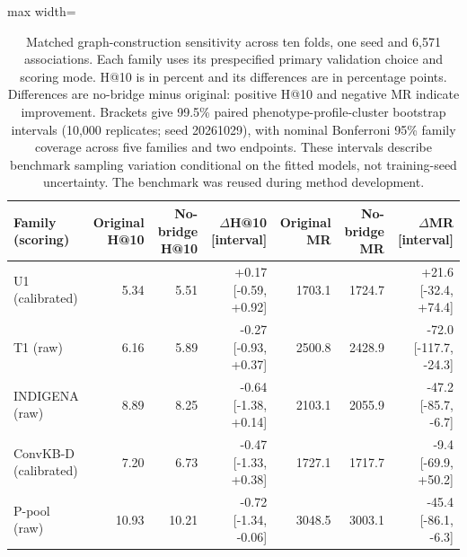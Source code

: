 \begin{table}[tb]
\centering\small
\caption{Matched graph-construction sensitivity across ten folds, one seed and 6,571 associations. Each family uses its prespecified primary validation choice and scoring mode. H@10 is in percent and its differences are in percentage points. Differences are no-bridge minus original: positive H@10 and negative MR indicate improvement. Brackets give 99.5\% paired phenotype-profile-cluster bootstrap intervals (10,000 replicates; seed 20261029), with nominal Bonferroni 95\% family coverage across five families and two endpoints. These intervals describe benchmark sampling variation conditional on the fitted models, not training-seed uncertainty. The benchmark was reused during method development.}
\label{tab:matched_kge_primary}
\begin{adjustbox}{max width=\linewidth}
\begin{tabular}{lrrrrrr}
\toprule
Family (scoring) & Original H@10 & No-bridge H@10 & $\Delta$H@10 [interval] & Original MR & No-bridge MR & $\Delta$MR [interval] \\
\midrule
U1 (calibrated) & 5.34 & 5.51 & +0.17 [-0.59, +0.92] & 1703.1 & 1724.7 & +21.6 [-32.4, +74.4] \\
T1 (raw) & 6.16 & 5.89 & -0.27 [-0.93, +0.37] & 2500.8 & 2428.9 & -72.0 [-117.7, -24.3] \\
INDIGENA (raw) & 8.89 & 8.25 & -0.64 [-1.38, +0.14] & 2103.1 & 2055.9 & -47.2 [-85.7, -6.7] \\
ConvKB-D (calibrated) & 7.20 & 6.73 & -0.47 [-1.33, +0.38] & 1727.1 & 1717.7 & -9.4 [-69.9, +50.2] \\
P-pool (raw) & 10.93 & 10.21 & -0.72 [-1.34, -0.06] & 3048.5 & 3003.1 & -45.4 [-86.1, -6.3] \\
\bottomrule
\end{tabular}
\end{adjustbox}
\end{table}
